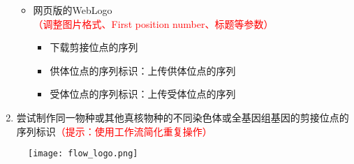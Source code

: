 \documentclass{TIJMUjiaoanSY}
\begin{document}
\begin{enumerate}
\begin{itemize}
      \item 网页版的WebLogo\textcolor{red}{（调整图片格式、First position number、标题等参数）}
	\begin{itemize}
	  \item 下载剪接位点的序列
	  \item 供体位点的序列标识：上传供体位点的序列
	  \item 受体位点的序列标识：上传受体位点的序列
	\end{itemize}
    \end{itemize}
  \item 尝试制作同一物种或其他真核物种的不同染色体或全基因组基因的剪接位点的序列标识\textcolor{red}{（提示：使用工作流简化重复操作）}
\end{enumerate}

\begin{figure}[ht]
  \centering
  \texttt{[image: flow\_logo.png]}
\end{figure}


\otherTail
\end{document}
